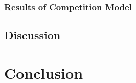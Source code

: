 \documentclass[a4paper,12pt]{article}
\begin{document}
\subsubsection{Results of Competition Model}


\subsection{Discussion}


\section{Conclusion}
\end{document}
